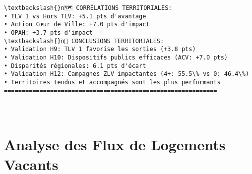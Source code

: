 \documentclass[11pt]{article}
\makeatletter
\newcommand{\boxspacing}{\kern\kvtcb@left@rule\kern\kvtcb@boxsep}
\newcommand{\prompt}[4]{
        {\ttfamily\llap{{\color{#2}[#3]:\hspace{3pt}#4}}\vspace{-\baselineskip}}
    }
\makeatother
\begin{document}
    \begin{Verbatim}[commandchars=\\\{\}]
\textbackslash{}n🗺️ CORRÉLATIONS TERRITORIALES:
• TLV 1 vs Hors TLV: +5.1 pts d'avantage
• Action Cœur de Ville: +7.0 pts d'impact
• OPAH: +3.7 pts d'impact
\textbackslash{}n🎯 CONCLUSIONS TERRITORIALES:
• Validation H9: TLV 1 favorise les sorties (+3.8 pts)
• Validation H10: Dispositifs publics efficaces (ACV: +7.0 pts)
• Disparités régionales: 6.1 pts d'écart
• Validation H12: Campagnes ZLV impactantes (4+: 55.5\% vs 0: 46.4\%)
• Territoires tendus et accompagnés sont les plus performants
============================================================
    \end{Verbatim}

    

    \begin{tcolorbox}[breakable, size=fbox, boxrule=1pt, pad at break*=1mm,colback=cellbackground, colframe=cellborder]
\prompt{In}{incolor}{ }{\boxspacing}
\begin{Verbatim}[commandchars=\\\{\}]

\end{Verbatim}
\end{tcolorbox}

    \begin{tcolorbox}[breakable, size=fbox, boxrule=1pt, pad at break*=1mm,colback=cellbackground, colframe=cellborder]
\prompt{In}{incolor}{ }{\boxspacing}
\begin{Verbatim}[commandchars=\\\{\}]

\end{Verbatim}
\end{tcolorbox}

    \begin{tcolorbox}[breakable, size=fbox, boxrule=1pt, pad at break*=1mm,colback=cellbackground, colframe=cellborder]
\prompt{In}{incolor}{ }{\boxspacing}
\begin{Verbatim}[commandchars=\\\{\}]

\end{Verbatim}
\end{tcolorbox}

    \section{Analyse des Flux de Logements
Vacants}\label{analyse-des-flux-de-logements-vacants}
\end{document}
